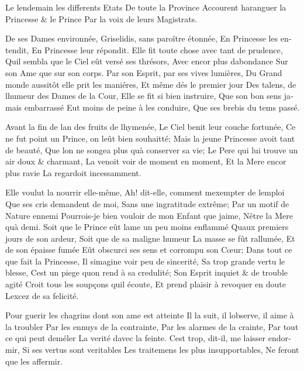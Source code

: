\documentclass[14pt,a4paper]{memoir}
\begin{document}
\begin{otherlanguage}{french}
{Le lendemain les differents Etats} {De toute la Province} {Accourent
haranguer la Princesse \& le Prince } {Par la voix de leurs Magistrats.}

{De ses Dames environnée,} {Griselidis, sans paroître étonnée,} {En
Princesse les entendit,} {En Princesse leur répondit.} {Elle fit toute
chose avec tant de prudence,} {Qu\textquotesingle il sembla que le Ciel
eût versé ses thrésors, } {Avec encor plus d\textquotesingle abondance}
{Sur son Ame que sur son corps.} {Par son Esprit, par ses vives
lumières,} {Du Grand monde aussitôt elle prit les maniéres, } {Et même
dés le premier jour} {Des talens, de l\textquotesingle humeur des Dames
de la Cour,} {Elle se fit si bien instruire,} {Que son bon sens jamais
embarrassé} {Eut moins de peine à les conduire,} {Que ses brebis du tems
passé.}

{Avant la fin de l\textquotesingle an des fruits de
l\textquotesingle hymenée,} {Le Ciel benit leur couche fortunée,} {Ce ne
fut point un Prince, on l\textquotesingle eût bien souhaitté;} {Mais la
jeune Princesse avoit tant de beauté,} {Que l\textquotesingle on ne
songea plus qu\textquotesingle à conserver sa vie;} {Le Pere qui lui
trouve un air doux \& charmant,} {La venoit voir de moment en moment,}
{Et la Mere encor plus ravie} {La regardoit incessamment.}

{Elle voulut la nourrir elle-même,} {Ah! dit-elle, comment
m\textquotesingle exempter de l\textquotesingle emploi} {Que ses cris
demandent de moi,} {Sans une ingratitude extrême;} {Par un motif de
Nature ennemi} {Pourrois-je bien vouloir de mon Enfant que
j\textquotesingle aime,} {N\textquotesingle être la Mere
qu\textquotesingle à demi.} {Soit que le Prince eût
l\textquotesingle ame un peu moins enflammé} {Qu\textquotesingle aux
premiers jours de son ardeur,} {Soit que de sa maligne humeur} {La masse
se fût rallumée,} {Et de son épaisse fumée} {Eût obscurci ses sens et
corrompu son Cœur; } {Dans tout ce que fait la Princesse,} {Il
s\textquotesingle imagine voir peu de sincerité,} {Sa trop grande vertu
le blesse,} {C\textquotesingle est un piege qu\textquotesingle on rend à
sa credulité;} {Son Esprit inquiet \& de trouble agité} {Croit tous les
soupçons qu\textquotesingle il écoute,} {Et prend plaisir à revoquer en
doute} {L\textquotesingle excez de sa felicité.}

{Pour guerir les chagrins dont son ame est atteinte} {Il la suit, il
l\textquotesingle observe, il aime à la troubler } {Par les ennuys de la
contrainte,} {Par les alarmes de la crainte,} {Par tout ce qui peut
deméler} {La verité d\textquotesingle avec la feinte.}
{C\textquotesingle est trop, dit-il, me laisser endormir,} {Si ses
vertus sont veritables} {Les traitemens les plus insupportables,} {Ne
feront que les affermir.}


\end{otherlanguage}
\end{document}
